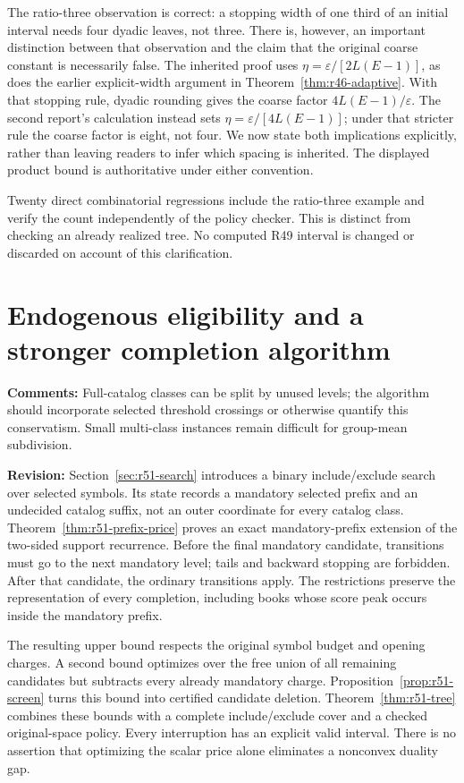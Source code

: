 \documentclass[11pt,letterpaper]{article}
\begin{document}
The ratio-three observation is correct: a stopping width of one third of an initial interval needs four dyadic leaves, not three. There is, however, an important distinction between that observation and the claim that the original coarse constant is necessarily false. The inherited proof uses $\eta=\varepsilon/[2L(E-1)]$, as does the earlier explicit-width argument in Theorem~\ref{thm:r46-adaptive}. With that stopping rule, dyadic rounding gives the coarse factor $4L(E-1)/\varepsilon$. The second report's calculation instead sets $\eta=\varepsilon/[4L(E-1)]$; under that stricter rule the coarse factor is eight, not four. We now state both implications explicitly, rather than leaving readers to infer which spacing is inherited. The displayed product bound is authoritative under either convention.

Twenty direct combinatorial regressions include the ratio-three example and verify the count independently of the policy checker. This is distinct from checking an already realized tree. No computed R49 interval is changed or discarded on account of this clarification.

\section{Endogenous eligibility and a stronger completion algorithm}
\textbf{Comments:} Full-catalog classes can be split by unused levels; the algorithm should incorporate selected threshold crossings or otherwise quantify this conservatism. Small multi-class instances remain difficult for group-mean subdivision.

\textbf{Revision:} Section~\ref{sec:r51-search} introduces a binary include/exclude search over selected symbols. Its state records a mandatory selected prefix and an undecided catalog suffix, not an outer coordinate for every catalog class. Theorem~\ref{thm:r51-prefix-price} proves an exact mandatory-prefix extension of the two-sided support recurrence. Before the final mandatory candidate, transitions must go to the next mandatory level; tails and backward stopping are forbidden. After that candidate, the ordinary transitions apply. The restrictions preserve the representation of every completion, including books whose score peak occurs inside the mandatory prefix.

The resulting upper bound respects the original symbol budget and opening charges. A second bound optimizes over the free union of all remaining candidates but subtracts every already mandatory charge. Proposition~\ref{prop:r51-screen} turns this bound into certified candidate deletion. Theorem~\ref{thm:r51-tree} combines these bounds with a complete include/exclude cover and a checked original-space policy. Every interruption has an explicit valid interval. There is no assertion that optimizing the scalar price alone eliminates a nonconvex duality gap.
\end{document}
